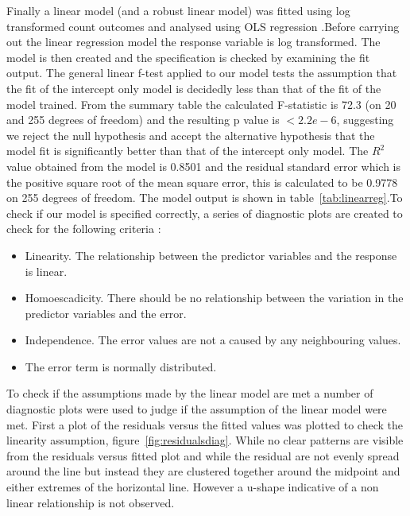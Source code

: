 Finally a linear model (and a robust linear model) was fitted using log transformed count outcomes and analysed using OLS regression \citep{UCLAPoiss}.Before carrying out the linear regression model the response variable is log transformed. The model is then created and the specification is checked by examining the fit output. The general linear f-test applied to our model tests the assumption that the fit of the intercept only model is decidedly less than that of the fit of the model trained. From the summary table the calculated F-statistic is 72.3 (on 20 and 255 degrees of freedom) and the resulting p value is $< 2.2e-6$, suggesting we reject the null hypothesis and accept the alternative hypothesis that the model fit is significantly better than that of the intercept only model. The $R^2$ value obtained from the model is  0.8501 and the residual standard error which is the positive square root of the mean square error, this is calculated to be 0.9778 on 255 degrees of freedom. The model output is shown in table~\ref{tab:linearreg}.To check if our model is specified correctly, a series of diagnostic plots are created to check for the following criteria :
\begin{itemize}
\item Linearity. The relationship between the predictor variables and the response is linear.
\item Homoescadicity. There should be no relationship between the variation in the predictor variables and the error.
\item Independence. The error values are not a caused by any neighbouring values.
\item The error term is normally distributed.
\end{itemize}

To check if the assumptions made by the linear model are met a number of diagnostic plots were used to judge if the assumption of the linear model were met. First a plot of the residuals versus the fitted values was plotted to check the linearity assumption, figure~\ref{fig:residualsdiag}. While no clear patterns are visible from the residuals versus fitted plot and while the residual are not evenly spread around the line but instead they are clustered together around the midpoint and either extremes of the horizontal line. However a u-shape indicative of a non linear relationship is not observed. 

